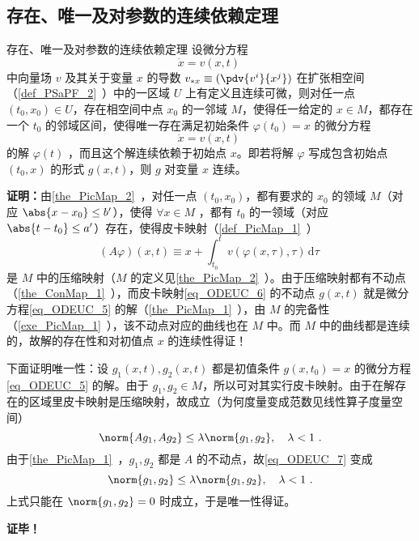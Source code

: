 \subsection{存在、唯一及对参数的连续依赖定理}
\begin{theorem}{存在、唯一及对参数的连续依赖定理}
设微分方程
\begin{equation}
\dot x=v(x,t)~
\end{equation}
中向量场 $v$ 及其关于变量 $x$ 的导数 $v_{*x}\equiv(\pdv{v^i}{x^j})$ 在扩张相空间（\autoref{def_PSaPF_2}~）中的一区域 $U$ 上有定义且连续可微，则对任一点 $(t_0,x_0)\in U$，存在相空间中点 $x_0$ 的一邻域 $M$，使得任一给定的 $x\in M$，都存在一个 $t_0$ 的邻域区间，使得唯一存在满足初始条件 $\varphi(t_0)=x$ 的微分方程
\begin{equation}\label{eq_ODEUC_5}
\dot x=v(x,t)~
\end{equation}
的解 $\varphi(t)$ ，而且这个解连续依赖于初始点 $x$。即若将解 $\varphi$ 写成包含初始点 $(t_0,x)$ 的形式 $g(x,t)$，则 $g$ 对变量 $x$ 连续。
\end{theorem}
\textbf{证明：}由\autoref{the_PicMap_2}~，对任一点 $(t_0,x_0)$，都有要求的 $x_0$ 的领域 $M$（对应 $\abs{x-x_0}\leq b'$），使得 $\forall x\in M$ ，都有  $t_0$ 的一领域（对应 $\abs{t-t_0}\leq a'$）存在，使得皮卡映射（\autoref{def_PicMap_1}~）
\begin{equation}\label{eq_ODEUC_6}
(A\varphi)(x,t)\equiv x+\int_{t_0}^{t}v(\varphi(x,\tau),\tau) \,\mathrm{d}{\tau} ~
\end{equation}
是 $M$ 中的压缩映射（$M$ 的定义见\autoref{the_PicMap_2}~）。由于压缩映射都有不动点（\autoref{the_ConMap_1}~），而皮卡映射\autoref{eq_ODEUC_6} 的不动点 $g(x,t)$ 就是微分方程\autoref{eq_ODEUC_5} 的解（\autoref{the_PicMap_1}~），由 $M$ 的完备性（\autoref{exe_PicMap_1}~），该不动点对应的曲线也在 $M$ 中。而 $M$ 中的曲线都是连续的，故解的存在性和对初值点 $x$ 的连续性得证！

下面证明唯一性：设 $g_1(x,t),g_2(x,t)$ 都是初值条件 $g(x,t_0)=x$ 的微分方程\autoref{eq_ODEUC_5} 的解。由于 $g_1,g_2\in M$，所以可对其实行皮卡映射。由于在解存在的区域里皮卡映射是压缩映射，故成立（为何度量变成范数见线性算子度量空间）
\begin{equation}\label{eq_ODEUC_7}
\norm{A g_1,A g_2}\leq\lambda\norm{g_1,g_2},\quad\lambda<1~.
\end{equation}
由于\autoref{the_PicMap_1}~，$g_1,g_2$ 都是 $A$ 的不动点，故\autoref{eq_ODEUC_7} 变成
\begin{equation}
\norm{g_1,g_2}\leq\lambda\norm{g_1,g_2},\quad\lambda<1~.
\end{equation}
上式只能在 $\norm{g_1,g_2}=0$ 时成立，于是唯一性得证。

\textbf{证毕！}